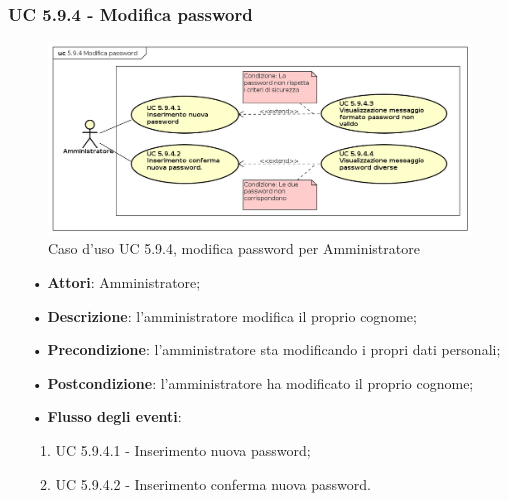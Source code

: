 \subsubsection{UC 5.9.4 - Modifica password}
\begin{figure}[H]
	\centering
	\includegraphics[width=15cm, keepaspectratio]{img/UC594.png} 
	\caption{Caso d'uso UC 5.9.4, modifica password per Amministratore}
\end{figure}
\begin{itemize}
	\item[•]\textbf{Attori}: Amministratore;
	\item[•]\textbf{Descrizione}: l'amministratore modifica il proprio cognome;
	\item[•]\textbf{Precondizione}: l'amministratore sta modificando i propri dati personali;
	\item[•]\textbf{Postcondizione}: l'amministratore ha modificato il proprio cognome; 
	\item[•]\textbf{Flusso degli eventi}: 
	\begin{enumerate}
		\item UC 5.9.4.1 - Inserimento nuova password;
		\item UC 5.9.4.2 - Inserimento conferma nuova password.
	\end{enumerate}
\end{itemize}

